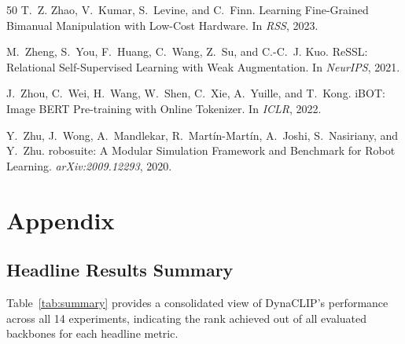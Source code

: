 \documentclass{article}
\newcommand{\methodname}{DynaCLIP}
\begin{document}
{\begin{thebibliography}{50}
T.~Z. Zhao, V.~Kumar, S.~Levine, and C.~Finn.
\newblock Learning Fine-Grained Bimanual Manipulation with Low-Cost Hardware.
\newblock In \emph{RSS}, 2023.

M.~Zheng, S.~You, F.~Huang, C.~Wang, Z.~Su, and C.-C.~J. Kuo.
\newblock ReSSL: Relational Self-Supervised Learning with Weak Augmentation.
\newblock In \emph{NeurIPS}, 2021.

J.~Zhou, C.~Wei, H.~Wang, W.~Shen, C.~Xie, A.~Yuille, and T.~Kong.
\newblock iBOT: Image BERT Pre-training with Online Tokenizer.
\newblock In \emph{ICLR}, 2022.

Y.~Zhu, J.~Wong, A.~Mandlekar, R.~Mart{\'i}n-Mart{\'i}n, A.~Joshi, S.~Nasiriany, and Y.~Zhu.
\newblock robosuite: A Modular Simulation Framework and Benchmark for Robot Learning.
\newblock \emph{arXiv:2009.12293}, 2020.

\end{thebibliography}
}

\newpage
\appendix
\section{Appendix}

\subsection{Headline Results Summary}
\label{app:summary}

Table~\ref{tab:summary} provides a consolidated view of \methodname{}'s performance across all 14 experiments, indicating the rank achieved out of all evaluated backbones for each headline metric.
\end{document}

